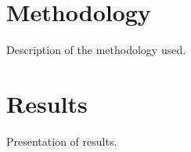 \documentclass[12pt, a4paper]{report}
\begin{document}


    \chapter{Methodology}
    \label{chap:methodology}
    Description of the methodology used.


    \chapter{Results}
    \label{chap:results}
    Presentation of results.

    
\end{document}
